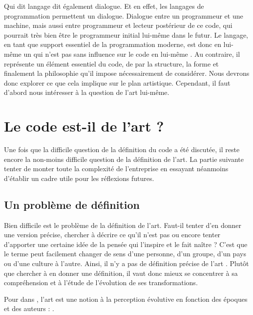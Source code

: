 \documentclass[12pt]{article} %
\begin{document}
Qui dit langage dit également dialogue. Et en effet, les langages de programmation permettent un dialogue. Dialogue entre un programmeur et une machine, mais aussi entre programmeur et lecteur postérieur de ce code, qui pourrait très bien être le programmeur initial lui-même dans le futur. Le langage, en tant que support essentiel de la programmation moderne, est donc en lui-même un  \cite{GerardBerry2015} qui n'est pas sans influence sur le code en lui-même \cite{Dijkstra1976}. Au contraire, il représente un élément essentiel du code, de par la structure, la forme et finalement la philosophie qu'il impose nécessairement de considérer.  Nous devrons donc explorer ce que cela implique sur le plan artistique. Cependant, il faut d'abord nous intéresser à la question de l'art lui-même.

\section{Le code est-il de l'art ?} \label{section:code-est-il-art}
Une fois que la difficile question de la définition du code a été discutée, il reste encore la non-moins difficile question de la définition de l'art. La partie suivante tenter de monter toute la complexité de l'entreprise en essayant néanmoins d'établir un cadre utile pour les réflexions futures.

\subsection{Un problème de définition}
Bien difficile est le problème de la définition de l'art. Faut-il tenter d'en donner une version précise, chercher à décrire ce qu'il n'est pas ou encore tenter d'apporter une certaine idée de la pensée qui l'inspire et le fait naître ? C'est que le terme peut facilement changer de sens d'une personne, d'un groupe, d'un pays ou d'une culture à l'autre. Ainsi, il n'y a pas de définition précise de l'art \cite{SDavies1991}. Plutôt que chercher à en donner une définition, il vaut donc mieux se concentrer à sa compréhension et à l'étude de l'évolution de ses transformations. 

Pour \citeauthor{SDavies1991} dans , l'art est une notion à la perception évolutive en fonction des époques et des auteurs :  \cite{SDavies1991}. 
\end{document}
